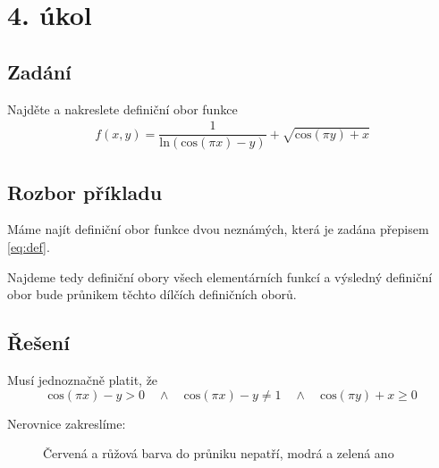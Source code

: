 \section{4. úkol}
\subsection*{Zadání}
Najděte a nakreslete definiční obor funkce 
\begin{eqnarray}f(x,y) = \dfrac{1}{\mathrm{ln}(\mathrm{cos}(\pi x) - y)} + \sqrt{\mathrm{cos}(\pi y) + x}
\label{eq:def}
\end{eqnarray}
\subsection*{Rozbor příkladu}
Máme najít definiční obor funkce dvou neznámých, která je zadána přepisem \ref{eq:def}. 

Najdeme tedy definiční obory všech elementárních funkcí a výsledný definiční obor bude průnikem těchto dílčích definičních oborů.

\subsection*{Řešení}
Musí jednoznačně platit, že
\begin{displaymath}
\mbox{cos}(\pi x) - y  > 0 \quad \wedge \quad \mbox{cos}(\pi x) - y \neq 1 \quad \wedge \quad \mbox{cos}(\pi y) + x \geq 0
\end{displaymath}

\noindent Nerovnice zakreslíme:

\begin{figure}[H]
	\centering
	
	\caption{Červená a růžová barva do průniku nepatří, modrá a zelená ano}
\end{figure}
